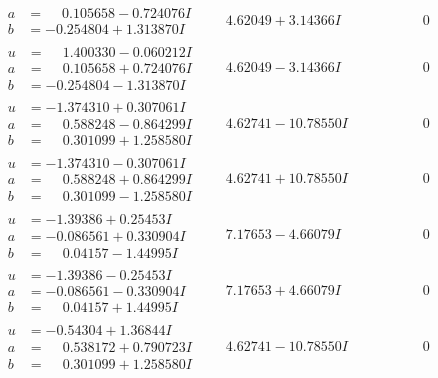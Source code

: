 \documentclass[1p]{elsarticle_modified}
\theoremstyle{definition}
\begin{document}
$$\begin{array}{c|c|c}
\begin{aligned}
a &= \phantom{-}0.105658 - 0.724076 I \\
b &= -0.254804 + 1.313870 I\end{aligned}
 & \phantom{-}4.62049 + 3.14366 I & \phantom{-0.000000 } 0 \\ \hline\begin{aligned}
u &= \phantom{-}1.400330 - 0.060212 I \\
a &= \phantom{-}0.105658 + 0.724076 I \\
b &= -0.254804 - 1.313870 I\end{aligned}
 & \phantom{-}4.62049 - 3.14366 I & \phantom{-0.000000 } 0 \\ \hline\begin{aligned}
u &= -1.374310 + 0.307061 I \\
a &= \phantom{-}0.588248 - 0.864299 I \\
b &= \phantom{-}0.301099 + 1.258580 I\end{aligned}
 & \phantom{-}4.62741 - 10.78550 I & \phantom{-0.000000 } 0 \\ \hline\begin{aligned}
u &= -1.374310 - 0.307061 I \\
a &= \phantom{-}0.588248 + 0.864299 I \\
b &= \phantom{-}0.301099 - 1.258580 I\end{aligned}
 & \phantom{-}4.62741 + 10.78550 I & \phantom{-0.000000 } 0 \\ \hline\begin{aligned}
u &= -1.39386 + 0.25453 I \\
a &= -0.086561 + 0.330904 I \\
b &= \phantom{-}0.04157 - 1.44995 I\end{aligned}
 & \phantom{-}7.17653 - 4.66079 I & \phantom{-0.000000 } 0 \\ \hline\begin{aligned}
u &= -1.39386 - 0.25453 I \\
a &= -0.086561 - 0.330904 I \\
b &= \phantom{-}0.04157 + 1.44995 I\end{aligned}
 & \phantom{-}7.17653 + 4.66079 I & \phantom{-0.000000 } 0 \\ \hline\begin{aligned}
u &= -0.54304 + 1.36844 I \\
a &= \phantom{-}0.538172 + 0.790723 I \\
b &= \phantom{-}0.301099 + 1.258580 I\end{aligned}
 & \phantom{-}4.62741 - 10.78550 I & \phantom{-0.000000 } 0 \\ \hline\begin{aligned}

\end{aligned}
\end{array}$$
\end{document}
